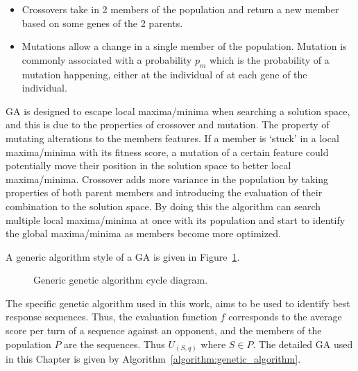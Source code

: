 \begin{itemize}
    \item Crossovers take in 2 members of the population and return a new member
    based on some genes of the 2 parents.
    \item Mutations allow a change in a single member of the population. Mutation
    is commonly associated with a probability \(p_m\) which is the probability
    of a mutation happening, either at the individual of at each gene of the
    individual.
\end{itemize}

GA is designed to escape local maxima/minima when searching a solution space,
and this is due to the properties of crossover and mutation. The property of
mutating alterations to the members features. If a member is ‘stuck’ in a local
maxima/minima with its fitness score, a mutation of a certain feature could
potentially move their position in the solution space to better local
maxima/minima. Crossover adds more variance in the population by taking
properties of both parent members and introducing the evaluation of their
combination to the solution space. By doing this the algorithm can search
multiple local maxima/minima at once with its population and start to identify
the global maxima/minima as members become more optimized.

A generic algorithm style of a GA is given in Figure~\ref{fig:ga_flow_diagram}.

\begin{figure}[!htbp]
    \centering
    
    \caption{Generic genetic algorithm cycle diagram.}\label{fig:ga_flow_diagram}
\end{figure}

The specific genetic algorithm used in this work, aims to be used to identify
best response sequences. Thus, the evaluation function \(f\) corresponds to the
average score per turn of a sequence against an opponent, and the members of the
population \(P\) are the sequences. Thus \(U_{(S, q)}\) where \(S \in P\). The
detailed GA used in this Chapter is given by
Algorithm~\ref{algorithm:genetic_algorithm}.

